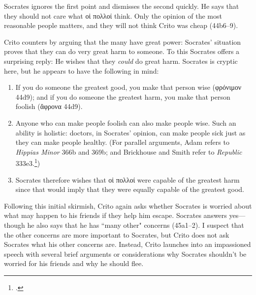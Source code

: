 \documentclass[12pt,letterpaper]{article}
\begin{document}
Socrates ignores the first point and dismisses the second quickly. He says that they should not care what \textgreek{οἱ πολλοί} think. Only the opinion of the most reasonable people matters, and they will not think Crito was cheap (44b6--9).

Crito counters by arguing that the many have great power: Socrates' situation proves that they can do very great harm to someone. To this Socrates offers a surprising reply: He wishes that they \emph{could} do great harm. Socrates is cryptic here, but he appears to have the following in mind:

\begin{enumerate}

    \item If you do someone the greatest good, you make that person wise (\textgreek{φρόνιμον} 44d9); and if you do someone the greatest harm, you make that person foolish (\textgreek{ἄφρονα} 44d9).

    \item Anyone who can make people foolish can also make people wise. Such an ability is holistic: doctors, in Socrates' opinion, can make people sick just as they can make people healthy. (For parallel arguments, Adam refers to \textit{Hippias Minor} 366b and 369b; and Brickhouse and Smith refer to \textit{Republic} 333e3.\footcites[][on 44d]{adam1988-crito}[][200]{brickhouse-smith2004-plato-trial-of-socrates})

    \item Socrates therefore wishes that \textgreek{οἱ πολλοί} were capable of the greatest harm since that would imply that they were equally capable of the greatest good.

\end{enumerate}

Following this initial skirmish, Crito again asks whether Socrates is worried about what may happen to his friends if they help him escape. Socrates answers yes---though he also says that he has ``many other" concerns (45a1--2). I suspect that the other concerns are more important to Socrates, but Crito does not ask Socrates what his other concerns are. Instead, Crito launches into an impassioned speech with several brief arguments or considerations why Socrates shouldn't be worried for his friends and why he should flee.
\end{document}
